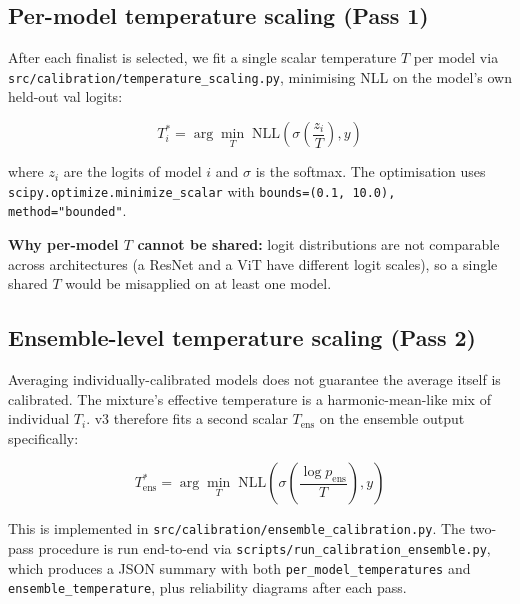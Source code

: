 \documentclass[10pt,a4paper]{article}
\begin{document}
\subsection{Per-model temperature scaling (Pass 1)}

After each finalist is selected, we fit a single scalar temperature
$T$ per model via \texttt{src/calibration/temperature\_scaling.py},
minimising NLL on the model's own held-out val logits:

\begin{equation}
  T_i^* = \arg\min_T \; \text{NLL}\!\left(
    \sigma\!\left(\frac{z_i}{T}\right), y
  \right)
\end{equation}

where $z_i$ are the logits of model $i$ and $\sigma$ is the softmax.
The optimisation uses \texttt{scipy.optimize.minimize\_scalar} with
\texttt{bounds=(0.1, 10.0), method="bounded"}.

\textbf{Why per-model $T$ cannot be shared:} logit distributions are
not comparable across architectures (a ResNet and a ViT have
different logit scales), so a single shared $T$ would be misapplied
on at least one model.

\subsection{Ensemble-level temperature scaling (Pass 2)}

Averaging individually-calibrated models does not guarantee the
average itself is calibrated. The mixture's effective temperature is
a harmonic-mean-like mix of individual $T_i$. v3 therefore fits a
second scalar $T_{\text{ens}}$ on the ensemble output specifically:

\begin{equation}
  T_{\text{ens}}^* = \arg\min_T \;
    \text{NLL}\!\left(\sigma\!\left(\frac{\log p_{\text{ens}}}{T}\right), y\right)
\end{equation}

This is implemented in
\texttt{src/calibration/ensemble\_calibration.py}. The two-pass
procedure is run end-to-end via
\texttt{scripts/run\_calibration\_ensemble.py}, which produces a
JSON summary with both \texttt{per\_model\_temperatures} and
\texttt{ensemble\_temperature}, plus reliability diagrams after each
pass.
\end{document}
